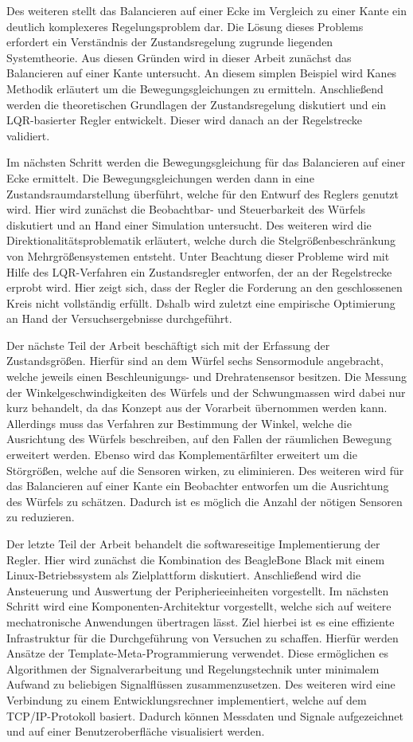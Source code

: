 Des weiteren stellt das Balancieren auf einer Ecke im Vergleich zu einer Kante ein deutlich komplexeres Regelungsproblem dar. Die Lösung dieses Problems erfordert ein Verständnis der Zustandsregelung zugrunde liegenden Systemtheorie. Aus diesen Gründen wird in dieser Arbeit zunächst das Balancieren auf einer Kante untersucht. An diesem simplen Beispiel wird Kanes Methodik erläutert um die Bewegungsgleichungen zu ermitteln. Anschließend werden die theoretischen Grundlagen der Zustandsregelung diskutiert und ein LQR-basierter Regler entwickelt. Dieser wird danach an der Regelstrecke validiert.

Im nächsten Schritt werden die Bewegungsgleichung für das Balancieren auf einer Ecke ermittelt. Die Bewegungsgleichungen werden dann in eine Zustandsraumdarstellung überführt, welche für den Entwurf des Reglers genutzt wird. Hier wird zunächst die Beobachtbar- und Steuerbarkeit des Würfels diskutiert und an Hand einer Simulation untersucht. Des weiteren wird die Direktionalitätsproblematik erläutert, welche durch die Stelgrößenbeschränkung von Mehrgrößensystemen entsteht. Unter Beachtung dieser Probleme wird mit Hilfe des LQR-Verfahren ein Zustandsregler entworfen, der an der Regelstrecke erprobt wird. Hier zeigt sich, dass der Regler die Forderung an den geschlossenen Kreis nicht vollständig erfüllt. Dshalb wird zuletzt eine empirische Optimierung an Hand der Versuchsergebnisse durchgeführt.

Der nächste Teil der Arbeit beschäftigt sich mit der Erfassung der Zustandsgrößen. Hierfür sind an dem Würfel sechs Sensormodule angebracht, welche jeweils einen Beschleunigungs- und Drehratensensor besitzen. Die Messung der Winkelgeschwindigkeiten des Würfels und der Schwungmassen wird dabei nur kurz behandelt, da das Konzept aus der Vorarbeit übernommen werden kann. Allerdings muss das Verfahren zur Bestimmung der Winkel, welche die Ausrichtung des Würfels beschreiben, auf den Fallen der räumlichen Bewegung erweitert werden. Ebenso wird das Komplementärfilter erweitert um die Störgrößen, welche auf die Sensoren wirken, zu eliminieren. Des weiteren wird für das Balancieren auf einer Kante ein Beobachter entworfen um die Ausrichtung des Würfels zu schätzen. Dadurch ist es möglich die Anzahl der nötigen Sensoren zu reduzieren.

Der letzte Teil der Arbeit behandelt die softwareseitige Implementierung der Regler. Hier wird zunächst die Kombination des BeagleBone Black mit einem Linux-Betriebssystem als Zielplattform diskutiert. Anschließend wird die Ansteuerung und Auswertung der Peripherieeinheiten vorgestellt. Im nächsten Schritt wird eine Komponenten-Architektur vorgestellt, welche sich auf weitere mechatronische Anwendungen übertragen lässt. Ziel hierbei ist es eine effiziente Infrastruktur für die Durchgeführung von Versuchen zu schaffen. Hierfür werden Ansätze der Template-Meta-Programmierung verwendet. Diese ermöglichen es Algorithmen der Signalverarbeitung und Regelungstechnik unter minimalem Aufwand zu beliebigen Signalflüssen zusammenzusetzen. Des weiteren wird eine Verbindung zu einem Entwicklungsrechner implementiert, welche auf dem TCP/IP-Protokoll basiert. Dadurch können Messdaten und Signale aufgezeichnet und auf einer Benutzeroberfläche visualisiert werden.
